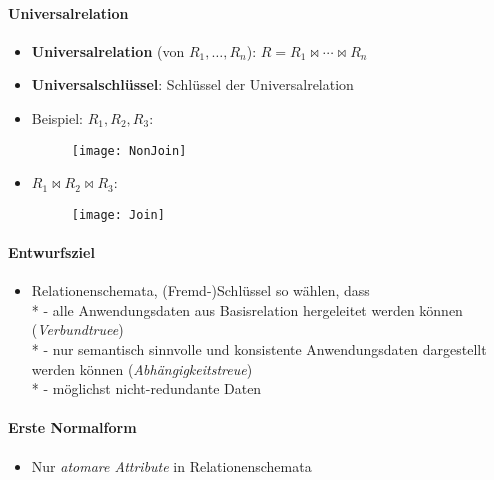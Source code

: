 \paragraph{Universalrelation}
\begin{itemize}
	\item \textbf{Universalrelation} (von \( R_1, \dots, R_n \)): \( R = R_1 \bowtie \cdots \bowtie R_n \)
	\item \textbf{Universalschlüssel}: Schlüssel der Universalrelation
	\item Beispiel: \( R_1, R_2, R_3 \):
	\begin{figure}[H]\centering\label{NonJoin}\texttt{[image: NonJoin]}\end{figure}
	\item \quad \( R_1 \bowtie R_2 \bowtie R_3 \):
	\begin{figure}[H]\centering\label{Join}\texttt{[image: Join]}\end{figure}
\end{itemize}



\paragraph{Entwurfsziel}
\begin{itemize}
	\item Relationenschemata, (Fremd-)Schlüssel so wählen, dass \\*
		- alle Anwendungsdaten aus Basisrelation hergeleitet werden können (\emph{Verbundtruee}) \\*
		- nur semantisch sinnvolle und konsistente Anwendungsdaten dargestellt werden können (\emph{Abhängigkeitstreue}) \\*
		- möglichst nicht-redundante Daten
\end{itemize}

\paragraph{Erste Normalform}
\begin{itemize}
	\item Nur \emph{atomare Attribute} in Relationenschemata
\end{itemize}

